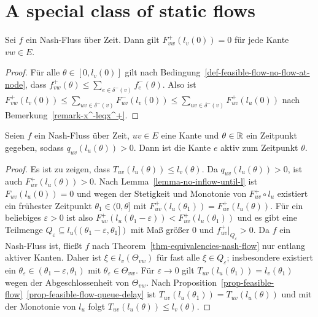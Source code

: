 \section{A special class of static flows}

\begin{lemma}\label{lemma-no-inflow-until-l}
	Sei $f$ ein Nash-Fluss über Zeit.
	Dann gilt $F_{vw}^+(l_v(0)) = 0$ für jede Kante $vw\in E$.
\end{lemma}
\begin{proof}
	Für alle $\theta\in [0, l_v(0)]$ gilt nach Bedingung~\ref{def-feasible-flow-no-flow-at-node}, dass $f_{vw}^+(\theta) \leq \sum_{e\in\delta^-(v)} f_e^-(\theta)$.
	Also ist $F_{vw}^+(l_v(0)) \leq \sum_{uv\in\delta^-(v)} F_{uv}^-(l_v(0))\leq \sum_{uv\in\delta^-(v)} F_{uv}^+(l_u(0))$ nach Bemerkung~\ref{remark-x^-leqx^+}.
\end{proof}

\begin{lemma}\label{lemma-nash-flow-waiting-queue-implies-active-edge}
	Seien $f$ ein Nash-Fluss über Zeit, $uv\in E$ eine Kante und $\theta\in\mathbb{R}$ ein Zeitpunkt gegeben, sodass $q_{uv}(l_u(\theta)) > 0$.
	Dann ist die Kante $e$ aktiv zum Zeitpunkt $\theta$.
\end{lemma}
\begin{proof}
	Es ist zu zeigen, dass $T_{uv}(l_u(\theta)) \leq l_v(\theta)$.
	Da $q_{uv}(l_u(\theta)) > 0$, ist auch $F^+_{uv}(l_u(\theta)) > 0$.
	Nach Lemma~\ref{lemma-no-inflow-until-l} ist $F_{uv}(l_u(0))=0$ und wegen der Stetigkeit und Monotonie von $F_{uv}^+\circ l_u$ existiert
	ein frühester Zeitpunkt $\theta_1\in (0, \theta]$ mit $F_{uv}^+(l_u(\theta_1)) = F_{uv}^+(l_u(\theta))$.
	Für ein beliebiges $\varepsilon>0$ ist also $F_{uv}^+(l_u(\theta_1-\varepsilon)) < F_{uv}^+(l_u(\theta_1))$ und es gibt eine Teilmenge $Q_\varepsilon \subseteq l_u((\theta_1 - \varepsilon, \theta_1])$ mit Maß größer 0 und $f_{uv}^+\big|_{Q_\varepsilon} > 0$.
	Da $f$ ein Nash-Fluss ist, fließt $f$ nach Theorem~\ref{thm-equivalencies-nash-flow} nur entlang aktiver Kanten.
	Daher ist $\xi\in l_v(\Theta_{vw})$ für fast alle $\xi\in Q_\varepsilon$; insbesondere existiert ein $\theta_\varepsilon\in (\theta_1-\varepsilon, \theta_1)$ mit $\theta_\varepsilon\in\Theta_{vw}$.
	Für $\varepsilon\rightarrow0$ gilt $T_{uv}(l_u(\theta_1))=l_v(\theta_1)$  wegen der Abgeschlossenheit von $\Theta_{vw}$.
	Nach Proposition~\ref{prop-feasible-flow}~\ref{prop-feasible-flow-queue-delay} ist $T_{uv}(l_u(\theta_1)) = T_{uv}(l_u(\theta))$ und mit der Monotonie von $l_u$ folgt $T_{uv}(l_u(\theta))\leq l_v(\theta)$.
\end{proof}

